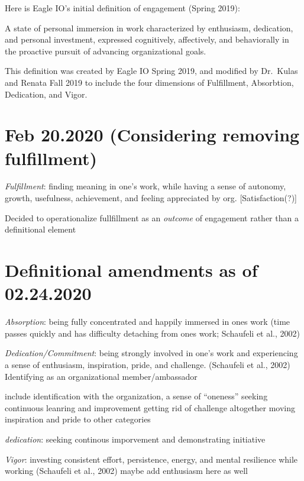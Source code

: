 \documentclass[
]{book}
\begin{document}
Here is Eagle IO's initial definition of engagement (Spring 2019):

A state of personal immersion in work characterized by enthusiasm, dedication, and personal investment, expressed cognitively, affectively, and behaviorally in the proactive pursuit of advancing organizational goals.

This definition was created by Eagle IO Spring 2019, and modified by Dr.~Kulas and Renata Fall 2019 to include the four dimensions of Fulfillment, Absorbtion, Dedication, and Vigor.

\hypertarget{feb-20.2020-considering-removing-fulfillment}{%
\section{Feb 20.2020 (Considering removing fulfillment)}\label{feb-20.2020-considering-removing-fulfillment}}

\emph{Fulfillment}: finding meaning in one's work, while having a sense of autonomy, growth, usefulness, achievement, and feeling appreciated by org. {[}Satisfaction(?){]}

Decided to operationalize fullfillment as an \emph{outcome} of engagement rather than a definitional element

\hypertarget{definitional-amendments-as-of-02.24.2020}{%
\section{Definitional amendments as of 02.24.2020}\label{definitional-amendments-as-of-02.24.2020}}

\emph{Absorption}: being fully concentrated and happily immersed in ones work (time passes quickly and has difficulty detaching from ones work; Schaufeli et al., 2002)

\emph{Dedication/Commitment}: being strongly involved in one's work and experiencing a sense of enthusiasm, inspiration, pride, and challenge. (Schaufeli et al., 2002) Identifying as an organizational member/ambassador

include identification with the organization, a sense of ``oneness''
seeking continuous leanring and improvement
getting rid of challenge altogether
moving inspiration and pride to other categories

\emph{dedication}: seeking continous imporvement and demonstrating initiative

\emph{Vigor}: investing consistent effort, persistence, energy, and mental resilience while working (Schaufeli et al., 2002)
maybe add enthusiasm here as well
\end{document}
